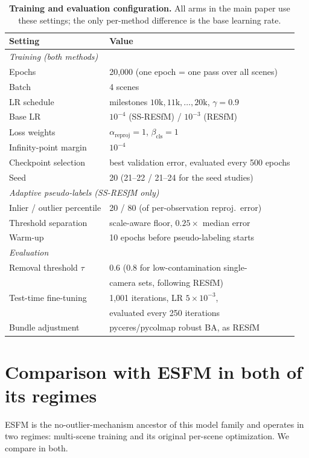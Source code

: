 \documentclass[10pt,twocolumn,letterpaper]{article}
\begin{document}
\begin{table}[tb]\centering\footnotesize
\caption{\textbf{Training and evaluation configuration.} All arms in the main paper use
these settings; the only per-method difference is the base learning rate.}
\label{tab:supp_config}
\setlength{\tabcolsep}{4pt}%
\begin{tabular}{ll}
\toprule
Setting & Value\\
\midrule
\multicolumn{2}{l}{\emph{Training (both methods)}}\\
Epochs & 20{,}000 (one epoch = one pass over all scenes)\\
Batch & 4 scenes\\
LR schedule & milestones $10\text{k},11\text{k},\ldots,20\text{k}$, $\gamma=0.9$\\
Base LR & $10^{-4}$ (SS-RESfM) / $10^{-3}$ (RESfM)\\
Loss weights & $\alpha_{\text{reproj}}=1$, $\beta_{\text{cls}}=1$\\
Infinity-point margin & $10^{-4}$\\
Checkpoint selection & best validation error, evaluated every 500 epochs\\
Seed & 20 (21--22 / 21--24 for the seed studies)\\
\midrule
\multicolumn{2}{l}{\emph{Adaptive pseudo-labels (SS-RESfM only)}}\\
Inlier / outlier percentile & 20 / 80 (of per-observation reproj.\ error)\\
Threshold separation & scale-aware floor, $0.25\times$ median error\\
Warm-up & 10 epochs before pseudo-labeling starts\\
\midrule
\multicolumn{2}{l}{\emph{Evaluation}}\\
Removal threshold $\tau$ & 0.6 (0.8 for low-contamination single-\\
 & camera sets, following RESfM)\\
Test-time fine-tuning & 1{,}001 iterations, LR $5\times10^{-3}$,\\
 & evaluated every 250 iterations\\
Bundle adjustment & pyceres/pycolmap robust BA, as RESfM\\
\bottomrule
\end{tabular}
\end{table}

\section{Comparison with ESFM in both of its regimes}\label{app:esfmboth}
ESFM is the no-outlier-mechanism ancestor of this model family and operates in two
regimes: multi-scene training and its original per-scene optimization. We compare in
both.
\end{document}
